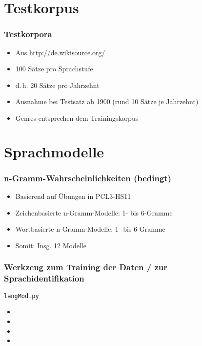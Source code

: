 \documentclass[t]{beamer} %
\begin{document}
\section{Testkorpus}

\begin{frame}
  \frametitle{Testkorpora}
  \begin{itemize}
  \item Aus \url{http://de.wikisource.org/}\pause
  \vspace*{1ex}
  \item 100 Sätze pro Sprachstufe\pause
  \item d.\,h. 20 Sätze pro Jahrzehnt\pause
  \item Ausnahme bei Testsatz ab 1900 (rund 10 Sätze je Jahrzehnt)
  \vspace*{1ex}
  \item Genres entsprechen dem Trainingskorpus
  \end{itemize}  
\end{frame}

\section{Sprachmodelle}

\begin{frame}
  \frametitle{n-Gramm-Wahrscheinlichkeiten (bedingt)}
  \begin{itemize}
  \item Basierend auf Übungen in PCL3-HS11\pause
  \vspace*{1ex}
  \item Zeichenbasierte n-Gramm-Modelle: 1- bis 6-Gramme\pause
  \item Wortbasierte n-Gramm-Modelle: 1- bis 6-Gramme \pause
  \item Somit: Insg. 12 Modelle \pause
  \vspace*{1ex}
  \end{itemize}  
\end{frame}

% 
\begin{frame}
  \frametitle{Werkzeug zum Training der Daten / zur Sprachidentifikation }
  \texttt{langMod.py}
  \begin{itemize}
  \item \pause
  \vspace*{1ex}
  \item \pause
  \item \pause
  \item 
  \vspace*{1ex}
  \end{itemize}  
\end{frame}
\end{document}
